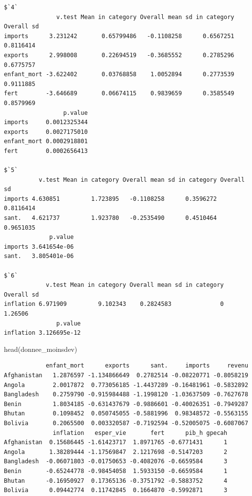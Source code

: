 \documentclass[
]{article}
\newenvironment{Shaded}{}{}
\newcommand{\FunctionTok}[1]{#1}
\newcommand{\NormalTok}[1]{#1}
\begin{document}
\begin{verbatim}
$`4`
               v.test Mean in category Overall mean sd in category Overall sd
imports      3.231242       0.65799486   -0.1108258      0.6567251  0.8116414
exports      2.998008       0.22694519   -0.3685552      0.2785296  0.6775757
enfant_mort -3.622402       0.03768858    1.0052894      0.2773539  0.9111885
fert        -3.646689       0.06674115    0.9839659      0.3585549  0.8579969
                 p.value
imports     0.0012325344
exports     0.0027175010
enfant_mort 0.0002918801
fert        0.0002656413

$`5`
          v.test Mean in category Overall mean sd in category Overall sd
imports 4.630851         1.723895   -0.1108258      0.3596272  0.8116414
sant.   4.621737         1.923780   -0.2535490      0.4510464  0.9651035
             p.value
imports 3.641654e-06
sant.   3.805401e-06

$`6`
            v.test Mean in category Overall mean sd in category Overall sd
inflation 6.971909         9.102343    0.2824583              0    1.26506
               p.value
inflation 3.126695e-12
\end{verbatim}

\begin{Shaded}
\begin{Highlighting}[]
\FunctionTok{head}\NormalTok{(donnee\_moinsdev)}
\end{Highlighting}
\end{Shaded}

\begin{verbatim}
            enfant_mort      exports      sant.     imports     revenu
Afghanistan   1.2876597 -1.134866649  0.2782514 -0.08220771 -0.8058219
Angola        2.0017872  0.773056185 -1.4437289 -0.16481961 -0.5832892
Bangladesh    0.2759790 -0.915984488 -1.1998120 -1.03637509 -0.7627678
Benin         1.8034185 -0.631437679 -0.9886601 -0.40026351 -0.7949287
Bhutan        0.1098452  0.050745055 -0.5881996  0.98348572 -0.5563155
Bolivia       0.2065500  0.003320587 -0.7192594 -0.52005075 -0.6087067
              inflation   esper_vie       fert      pib_h gpecah
Afghanistan  0.15686445 -1.61423717  1.8971765 -0.6771431      1
Angola       1.38289444 -1.17569847  2.1217698 -0.5147203      2
Bangladesh  -0.06071803 -0.01750653 -0.4082076 -0.6659584      3
Benin       -0.65244778 -0.98454058  1.5933150 -0.6659584      1
Bhutan      -0.16950927  0.17365136 -0.3751792 -0.5883752      4
Bolivia      0.09442774  0.11742845  0.1664870 -0.5992871      3
\end{verbatim}
\end{document}
